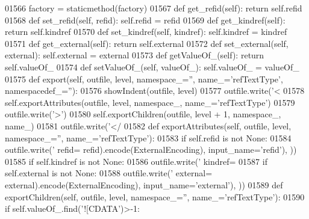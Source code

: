 \begin{DoxyCode}
{{{{{{{{{{{{{{{{{{{{{{{{{{{{{{{{{{{{{{{{{{{{{{{{{{{{{{{{{{{{{{{{{{{{{{{{{{{{{{{{{{{{{{{{{{{{{{{{{01566     factory = staticmethod(factory)
01567     \textcolor{keyword}{def }get_refid(self): \textcolor{keywordflow}{return} self.refid
01568     \textcolor{keyword}{def }set_refid(self, refid): self.refid = refid
01569     \textcolor{keyword}{def }get_kindref(self): \textcolor{keywordflow}{return} self.kindref
01570     \textcolor{keyword}{def }set_kindref(self, kindref): self.kindref = kindref
01571     \textcolor{keyword}{def }get_external(self): \textcolor{keywordflow}{return} self.external
01572     \textcolor{keyword}{def }set_external(self, external): self.external = external
01573     \textcolor{keyword}{def }getValueOf_(self): \textcolor{keywordflow}{return} self.valueOf\_
01574     \textcolor{keyword}{def }setValueOf_(self, valueOf\_): self.valueOf\_ = valueOf\_
01575     \textcolor{keyword}{def }export(self, outfile, level, namespace\_='', name\_='refTextType', namespacedef\_=''):
01576         showIndent(outfile, level)
01577         outfile.write(\textcolor{stringliteral}{'<%
01578         self.exportAttributes(outfile, level, namespace\_, name\_=\textcolor{stringliteral}{'refTextType'})
01579         outfile.write(\textcolor{stringliteral}{'>'})
01580         self.exportChildren(outfile, level + 1, namespace\_, name\_)
01581         outfile.write(\textcolor{stringliteral}{'</%
01582     \textcolor{keyword}{def }exportAttributes(self, outfile, level, namespace\_='', name\_='refTextType'):
01583         \textcolor{keywordflow}{if} self.refid \textcolor{keywordflow}{is} \textcolor{keywordflow}{not} \textcolor{keywordtype}{None}:
01584             outfile.write(\textcolor{stringliteral}{' refid=%
      refid).encode(ExternalEncoding), input\_name=\textcolor{stringliteral}{'refid'}), ))
01585         \textcolor{keywordflow}{if} self.kindref \textcolor{keywordflow}{is} \textcolor{keywordflow}{not} \textcolor{keywordtype}{None}:
01586             outfile.write(\textcolor{stringliteral}{' kindref=%
01587         \textcolor{keywordflow}{if} self.external \textcolor{keywordflow}{is} \textcolor{keywordflow}{not} \textcolor{keywordtype}{None}:
01588             outfile.write(\textcolor{stringliteral}{' external=%
      external).encode(ExternalEncoding), input\_name=\textcolor{stringliteral}{'external'}), ))
01589     \textcolor{keyword}{def }exportChildren(self, outfile, level, namespace\_='', name\_='refTextType'):
01590         \textcolor{keywordflow}{if} self.valueOf\_.find(\textcolor{stringliteral}{'![CDATA'})>-1:
}}}}}}}}}}}}}}}}}}}}}}}}}}}}}}}}}}}}}}}}}}}}}}}}}}}}}}}}}}}}}}}}}}}}}}}}}}}}}}}}}}}}}}}}}}}}}}}}}}}}}}
\end{DoxyCode}
